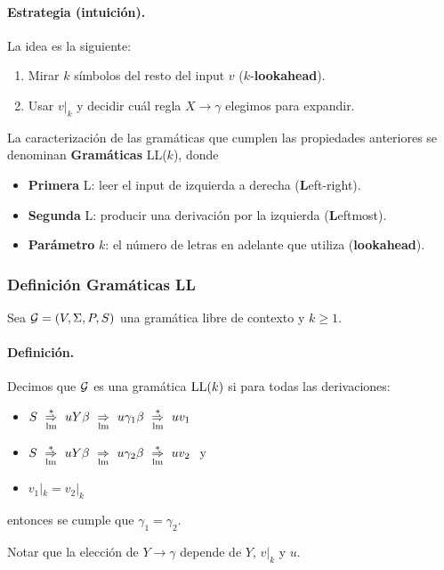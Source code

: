 \paragraph{Estrategia (intuición).} La idea es la siguiente:
\begin{enumerate}
    \item Mirar $k$ símbolos del resto del input $v$ ($k$-\textbf{lookahead}).
    \item Usar $v|_k$ y decidir cuál regla $X\to \gamma$ elegimos para expandir.
\end{enumerate}
La caracterización de las gramáticas que cumplen las propiedades anteriores se denominan \textbf{Gramáticas} LL($k$), donde
\begin{itemize}
    \item \textbf{Primera} L: leer el input de izquierda a derecha (\textbf{L}eft-right).
    \item \textbf{Segunda} L: producir una derivación por la izquierda (\textbf{L}eftmost).
    \item \textbf{Parámetro} $k$: el número de letras en adelante que utiliza (\textbf{lookahead}).
\end{itemize}

\subsubsection{Definición Gramáticas LL}
Sea $\mathcal{G}=(V,\Sigma,P,S)$ una gramática libre de contexto y $k \ge 1$.

\paragraph{Definición.} Decimos que $\mathcal{G}$ es una gramática $\text{LL}(k)$ si para todas las derivaciones:
\begin{itemize}
    \item $S \ \overunder{\Rightarrow}{\mathrm{lm}}{*} \ uY\beta \ \overunder{\Rightarrow}{\mathrm{lm}}{} \ u \gamma_1 \beta \ \overunder{\Rightarrow}{\mathrm{lm}}{*} \ u v_1$
    \item $S \ \overunder{\Rightarrow}{\mathrm{lm}}{*} \ uY\beta \ \overunder{\Rightarrow}{\mathrm{lm}}{} \ u \gamma_2 \beta \ \overunder{\Rightarrow}{\mathrm{lm}}{*} \ u v_2\ $ y
    \item $v_1|_k = v_2|_k$
\end{itemize}
entonces se cumple que $\gamma_1 = \gamma_2$. \medbreak

Notar que la elección de $Y\to \gamma$ depende de $Y$, $v|_k$ y $u$.

